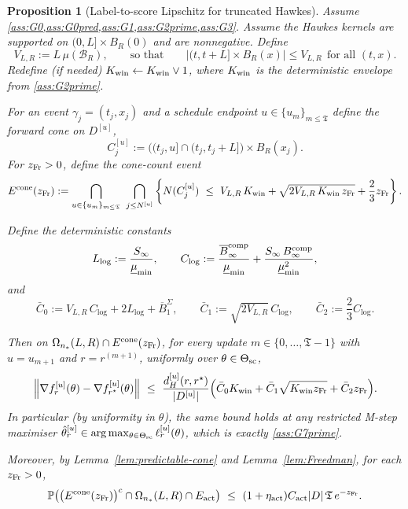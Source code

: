 \documentclass{statsoc}
\newtheorem{proposition}[proposition]{Proposition}
\newcommand{\1}{\mathbbm{1}}
\newcommand{\Tmax}{\mathfrak{T}}
\begin{document}

\begin{proposition}[Label-to-score Lipschitz for truncated Hawkes]
\label{prop:hawkes-G7prime}
Assume \cref{ass:G0,ass:G0pred,ass:G1,ass:G2prime,ass:G3}.
Assume the Hawkes kernels are supported on $(0,L]\times B_R(0)$ and are nonnegative.
Define
\[
V_{L,R}:=L\,\mu(\mathcal B_R),
\qquad\text{so that}\qquad
|(t,t+L]\times B_R(x)|\le V_{L,R}\ \ \text{for all }(t,x).
\]
Redefine (if needed) $K_{\rm win}\leftarrow K_{\rm win}\vee 1$, where $K_{\rm win}$ is the deterministic envelope from
\cref{ass:G2prime}.

For an event $\gamma_j=(t_j,x_j)$ and a schedule endpoint $u\in\{u_m\}_{m\le\Tmax}$ define the forward cone on $D^{[u]}$,
\[
C_j^{[u]}:=\big((t_j,u]\cap(t_j,t_j+L]\big)\times B_R(x_j).
\]
For $z_{\rm Fr}>0$, define the cone-count event
\[
E^{\rm cone}(z_{\rm Fr}):=
\bigcap_{u\in\{u_m\}_{m\le\Tmax}}\ \bigcap_{j\le N^{[u]}}
\left\{
N(C_j^{[u]})
\ \le\
V_{L,R}\,K_{\rm win}
+\sqrt{2V_{L,R}\,K_{\rm win}\,z_{\rm Fr}}
+\frac{2}{3}z_{\rm Fr}
\right\}.
\]

Define the deterministic constants
\[
L_{\log}:=\frac{S_\infty}{\underline\mu_{\min}},\qquad
C_{\log}:=\frac{\overline B_\infty^{\rm comp}}{\underline\mu_{\min}}
+\frac{S_\infty\,B_\infty^{\rm comp}}{\underline\mu_{\min}^2},
\]
and
\[
\bar C_0:=V_{L,R}\,C_{\log}+2L_{\log}+\overline B_1^\Sigma,\qquad
\bar C_1:=\sqrt{2V_{L,R}}\,C_{\log},\qquad
\bar C_2:=\frac{2}{3}C_{\log}.
\]

Then on $\Omega_{n_*}(L,R)\cap E^{\rm cone}(z_{\rm Fr})$, for every update $m\in\{0,\dots,\Tmax-1\}$ with $u=u_{m+1}$
and $r=r^{(m+1)}$, uniformly over $\theta\in\Theta_{\rm sc}$,
\[
\left\Vert \nabla f_{r}^{[u]}(\theta) - \nabla f_{r^\star}^{[u]}(\theta)\right\Vert
\ \le\ 
\frac{d_H^{[u]}(r,r^\star)}{|D^{[u]}|}
\Big(\bar C_0 K_{\rm win} + \bar C_1\sqrt{K_{\rm win} z_{\rm Fr}} + \bar C_2 z_{\rm Fr}\Big).
\]
In particular (by uniformity in $\theta$), the same bound holds at any restricted M-step maximiser
$\hat\theta_r^{[u]}\in\arg\max_{\theta\in\Theta_{\rm sc}}\ell_r^{[u]}(\theta)$, which is exactly \cref{ass:G7prime}.

Moreover, by Lemma~\ref{lem:predictable-cone} and Lemma~\ref{lem:Freedman}, for each $z_{\rm Fr}>0$,
\[
\mathbb P\!\left(\big(E^{\rm cone}(z_{\rm Fr})\big)^c\cap\Omega_{n_*}(L,R)\cap E_{\rm act}\right)
\ \le\ (1+\eta_{\rm act})C_{\rm act}|D|\,\Tmax\,e^{-z_{\rm Fr}}.
\]
\end{proposition}
\end{document}
